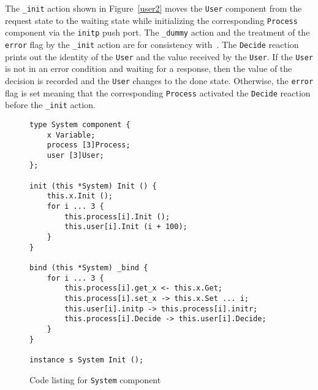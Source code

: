 The \verb+_init+ action shown in Figure~\ref{user2} moves the \verb+User+ component from the request state to the waiting state while initializing the corresponding \verb+Process+ component via the \verb+initp+ push port.
The \verb+_dummy+ action and the treatment of the \verb+error+ flag by the \verb+_init+ action are for consistency with~\cite{nancy1996distributed}.
The \verb+Decide+ reaction prints out the identity of the \verb+User+ and the value received by the \verb+User+.
If the \verb+User+ is not in an error condition and waiting for a response, then the value of the decision is recorded and the \verb+User+ changes to the done state.
Otherwise, the \verb+error+ flag is set meaning that the corresponding \verb+Process+ activated the \verb+Decide+ reaction before the \verb+_init+ action.

\clearpage

\begin{figure}
\begin{verbatim}
type System component {
    x Variable;
    process [3]Process;
    user [3]User;
};

init (this *System) Init () {
    this.x.Init ();
    for i ... 3 {
        this.process[i].Init ();
        this.user[i].Init (i + 100);
    }
}

bind (this *System) _bind {
    for i ... 3 {
        this.process[i].get_x <- this.x.Get;
        this.process[i].set_x -> this.x.Set ... i;
        this.user[i].initp -> this.process[i].initr;
        this.process[i].Decide -> this.user[i].Decide;
    }
}

instance s System Init ();
\end{verbatim}
\cprotect\caption{Code listing for \verb+System+ component}
\label{system}
\end{figure}

